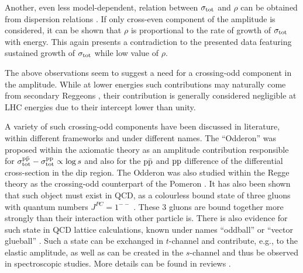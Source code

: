 Another, even less model-dependent, relation between $\sigma_{\rm tot}$ and $\rho$ can be obtained from dispersion relations . If only cross-even component of the amplitude is considered, it can be shown that $\rho$ is proportional to the rate of growth of $\sigma_{\rm tot}$ with energy. This again presents a contradiction to the presented data featuring sustained growth of $\sigma_{\rm tot}$ while low value of $\rho$.

The above observations seem to suggest a need for a crossing-odd component in the amplitude. While at lower energies such contributions may naturally come from secondary Reggeons , their contribution is generally considered negligible at LHC energies due to their intercept lower than unity.

A variety of such crossing-odd components have been discussed in literature, within different frameworks and under different names. The ``Odderon'' was proposed within the axiomatic theory \cite{nicolescu-1990,nicolescu-2007} as an amplitude contribution responsible for $\sigma_{\rm tot}^{\rm p\bar p} - \sigma_{\rm tot}^{\rm pp} \propto \log s$ and also for the $\rm p\bar p$ and $\rm pp$ difference of the differential cross-section in the dip region. The Odderon was also studied within the Regge theory as the crossing-odd counterpart of the Pomeron . It has also been shown that such object must exist in QCD, as a colourless bound state of three gluons with quantum numbers $J^{PC} = 1^{--}$ . These 3 gluons are bound together more strongly than their interaction with other particle is. There is also evidence for such state in QCD lattice calculations, known under names ``oddball'' or ``vector glueball'' . Such a state can be exchanged in $t$-channel and contribute, e.g., to the elastic amplitude, as well as can be created in the $s$-channel and thus be observed in spectroscopic studies. More details can be found in reviews \cite{braun,ewerz}.

